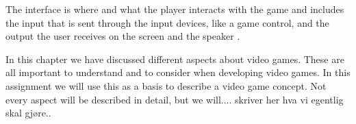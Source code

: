 The interface is where and what the player interacts with the game and includes the input that is sent through the input devices, like a game control, and the output the user receives on the screen and the speaker \cite{umlapproach}.

In this chapter we have discussed different aspects about video games. These are all important to understand and to consider when developing video games. In this assignment we will use this as a basis to describe a video game concept. Not every aspect will be described in detail, but we will.... skriver her hva vi egentlig skal gjøre.. 

